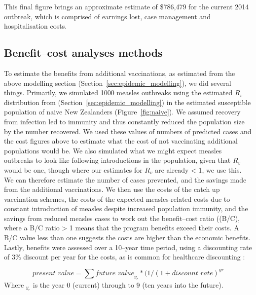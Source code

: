 \documentclass{article}
\begin{document}

This final figure brings an approximate estimate of \$786,479 for the current 2014 outbreak, which is comprised of earnings lost, case management and hospitalisation costs.


\subsection{Benefit--cost analyses methods}
To estimate the benefits from additional vaccinations, as estimated from the above modelling section (Section~\ref{sec:epidemic_modelling}), we did several things. Primarily, we simulated 1000 measles outbreaks using the estimated $R_v$ distribution from (Section~\ref{sec:epidemic_modelling}) in the estimated susceptible population of naive New Zealanders (Figure~\ref{fig:naive}). We assumed recovery from infection led to immunity and thus constantly reduced the population size by the number recovered. We used these values of numbers of predicted cases and the cost figures above to estimate what the cost of not vaccinating additional populations would be. We also simulated what we might expect measles outbreaks to look like following introductions in the population, given that $R_v$ would be one, though where our estimates for $R_v$ are already < 1, we use this. We can therefore estimate the number of cases prevented, and the savings made from the additional vaccinations. We then use the costs of the catch up vaccination schemes, the costs of the expected measles-related costs due to constant introduction of measles despite increased population immunity, and the savings from reduced measles cases to work out the benefit--cost ratio ((B/C), where a B/C ratio > 1 means that the program benefits exceed their costs. A B/C value less than one suggests the costs are higher than the economic benefits. Lastly, benefits were assessed over a 10--year time period, using a discounting rate of 3\% discount per year for the costs, as is common for healthcare discounting \citep{honeycutt6}:

\begin{equation} \label{eq:disc}
\textit{present value} = \sum \textit{future value}_y_r * (1/(1+\textit{discount rate})^{yr}
  \end{equation}
Where $_y_r$ is the year 0 (current) through to 9 (ten years into the future).
\end{document}
